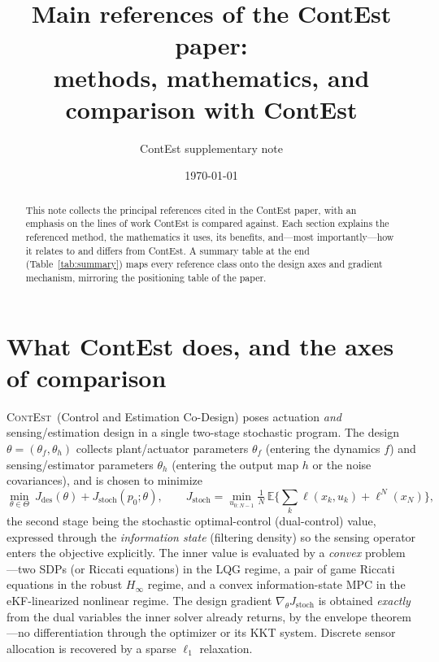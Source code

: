 \documentclass[11pt]{article}
\title{\bf Main references of the ContEst paper:\\
methods, mathematics, and comparison with ContEst}
\author{ContEst supplementary note}
\date{\today}
\newcommand{\E}{\mathbb{E}}
\newcommand{\Th}{\theta}
\newcommand{\ContEst}{\textsc{ContEst}}
\begin{document}
\maketitle

\begin{abstract}
This note collects the principal references cited in the ContEst paper, with an
emphasis on the lines of work ContEst is compared against. Each section explains
the referenced method, the mathematics it uses, its benefits, and---most
importantly---how it relates to and differs from ContEst. A summary table at the
end (Table~\ref{tab:summary}) maps every reference class onto the design axes and
gradient mechanism, mirroring the positioning table of the paper.
\end{abstract}

\tableofcontents

\section{What ContEst does, and the axes of comparison}\label{sec:contest}

\ContEst\ (Control and Estimation Co-Design) poses actuation \emph{and}
sensing/estimation design in a single two-stage stochastic program. The design
$\Th=(\Th_f,\Th_h)$ collects plant/actuator parameters $\Th_f$ (entering the
dynamics $f$) and sensing/estimator parameters $\Th_h$ (entering the output map
$h$ or the noise covariances), and is chosen to minimize
\begin{equation}\label{eq:contest}
\min_{\Th\in\Theta}\ J_{\mathrm{des}}(\Th)+J_{\mathrm{stoch}}(p_0;\Th),
\qquad
J_{\mathrm{stoch}}=\min_{u_{0:N-1}}\tfrac1N\,\E\Big\{\textstyle\sum_k
\ell(x_k,u_k)+\ell^N(x_N)\Big\},
\end{equation}
the second stage being the stochastic optimal-control (dual-control) value,
expressed through the \emph{information state} (filtering density) so the sensing
operator enters the objective explicitly. The inner value is evaluated by a
\emph{convex} problem---two SDPs (or Riccati equations) in the LQG regime, a pair
of game Riccati equations in the robust $H_\infty$ regime, and a convex
information-state MPC in the eKF-linearized nonlinear regime. The design gradient
$\nabla_\Th J_{\mathrm{stoch}}$ is obtained \emph{exactly} from the dual variables
the inner solver already returns, by the envelope theorem---no differentiation
through the optimizer or its KKT system. Discrete sensor allocation is recovered
by a sparse $\ell_1$ relaxation.
\end{document}

